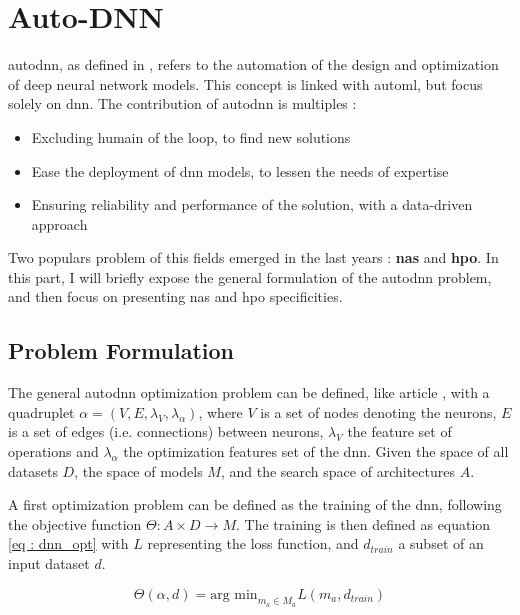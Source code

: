 \section{Auto-DNN}
\label{sec:autodnn}
\acrfull{autodnn}, as defined in \cite{talbi_automated_2021}, refers to the automation of the design and optimization of deep neural network models. This concept is linked with \acrfull{automl}, but focus solely on \acrshort{dnn}. The contribution of \acrshort{autodnn} is multiples : 
\begin{itemize}
    \item Excluding humain of the loop, to find new solutions 
    \item Ease the deployment of \acrshort{dnn} models, to lessen the needs of expertise
    \item Ensuring reliability and performance of the solution, with a data-driven approach
\end{itemize}

Two populars problem of this fields emerged in the last years : \textbf{\acrfull{nas}} and \textbf{\acrfull{hpo}}. In this part, I will briefly expose the general formulation of the \acrshort{autodnn} problem, and then focus on presenting \acrshort{nas} and \acrshort{hpo} specificities. 


\subsection{Problem Formulation}
\label{sec : autodnn_pbm}
The general \acrshort{autodnn} optimization problem can be defined, like article \cite{talbi_automated_2021}, with a quadruplet $\alpha = (V,E,\lambda_V, \lambda_\alpha)$, where $V$ is a set of nodes denoting the neurons, $E$ is a set of edges (i.e. connections) between neurons, $\lambda_V$ the feature set of operations and $\lambda_\alpha$ the optimization features set of the \acrshort{dnn}. Given the space of all datasets $D$, the space of models $M$, and the search space of architectures $A$.

A first optimization problem can be defined as the training of the \acrshort{dnn}, following the objective function $\Theta : A \times D \xrightarrow{} M$. The training is then defined as equation \ref{eq : dnn_opt} with $L$ representing the loss function, and $d_{train}$ a subset of an input dataset $d$. 

\begin{equation}
    \Theta(\alpha,d) = \text{arg min}_{m_a\in M_a}L(m_a,d_{train})
    \label{eq : dnn_opt}
\end{equation}

